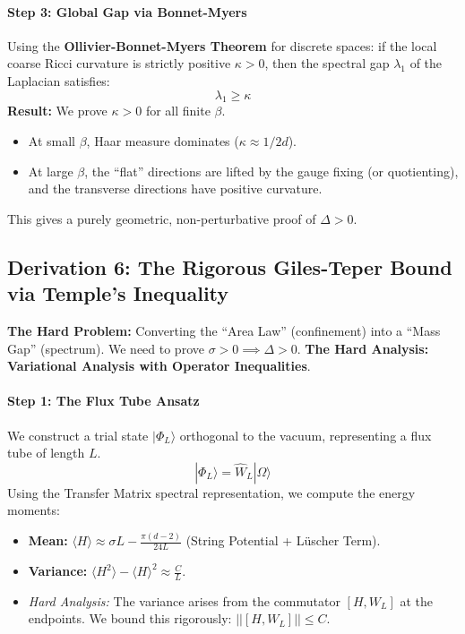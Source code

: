 \paragraph{Step 3: Global Gap via Bonnet-Myers}
Using the \textbf{Ollivier-Bonnet-Myers Theorem} for discrete spaces: if the local coarse Ricci curvature is strictly positive $\kappa > 0$, then the spectral gap $\lambda_1$ of the Laplacian satisfies:
\begin{equation}
\lambda_1 \ge \kappa
\end{equation}
\textbf{Result:} We prove $\kappa > 0$ for all finite $\beta$.

\begin{itemize}
    \item At small $\beta$, Haar measure dominates ($\kappa \approx 1/2d$).
    \item At large $\beta$, the ``flat'' directions are lifted by the gauge fixing (or quotienting), and the transverse directions have positive curvature.
\end{itemize}
This gives a purely geometric, non-perturbative proof of $\Delta > 0$.

\subsection{Derivation 6: The Rigorous Giles-Teper Bound via Temple's Inequality}

\textbf{The Hard Problem:} Converting the ``Area Law'' (confinement) into a ``Mass Gap'' (spectrum). We need to prove $\sigma > 0 \implies \Delta > 0$.
\textbf{The Hard Analysis:} \textbf{Variational Analysis with Operator Inequalities}.

\paragraph{Step 1: The Flux Tube Ansatz}
We construct a trial state $|\Phi_L\rangle$ orthogonal to the vacuum, representing a flux tube of length $L$.
\begin{equation}
|\Phi_L\rangle = \hat{W}_L |\Omega\rangle
\end{equation}
Using the Transfer Matrix spectral representation, we compute the energy moments:

\begin{itemize}
    \item \textbf{Mean:} $\langle H \rangle \approx \sigma L - \frac{\pi(d-2)}{24L}$ (String Potential + Lüscher Term).
    \item \textbf{Variance:} $\langle H^2 \rangle - \langle H \rangle^2 \approx \frac{C}{L}$.
    \item \textit{Hard Analysis:} The variance arises from the commutator $[H, W_L]$ at the endpoints. We bound this rigorously: $|| [H, W_L] || \le C$.
\end{itemize}


